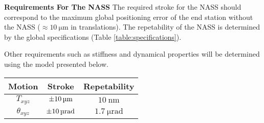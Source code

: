 \begin{minipage}[t]{0.63\linewidth}
  \textbf{Requirements For The NASS}
  The required stroke for the NASS should correspond to the maximum global
  positioning error of the end station without the NASS (\(\approx \SI{10}{\micro\metre}\) in translations).
  The repetability of the NASS is determined by the global specifications (Table \ref{table:specifications}).

  Other requirements such as stiffness and dynamical properties will be determined using the model presented below.
\end{minipage}
\begin{minipage}[t]{0.37\linewidth}
  \vspace{-1em}
  \begin{tikztable}
    \label{table:nass_specification}
    \centering
    \begin{tabular}{ccc}
      \toprule
      \textbf{Motion} & \textbf{Stroke} & \textbf{Repetability}\\
      \midrule
      \(T_{xyz}\) & \(\SI{\pm 10}{\micro\metre}\) & \(\SI{10}{\nano\metre}\)\\
      \(\theta_{xyz}\) & \(\SI{\pm 10}{\micro\radian}\) & \(\SI{1.7}{\micro\radian}\)\\
      \bottomrule
    \end{tabular}
  \end{tikztable}
\end{minipage}





